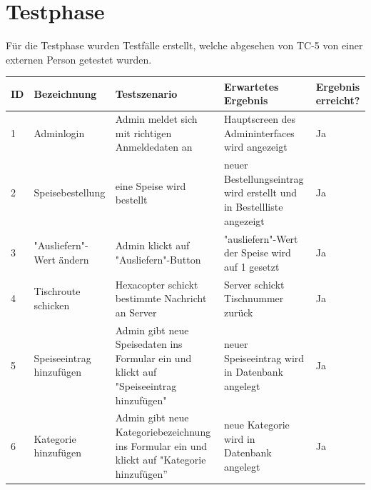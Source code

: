 \section{Testphase}
Für die Testphase wurden Testfälle erstellt, welche abgesehen von TC-5 von einer externen Person getestet wurden.

\begin{table}[H]
\centering
\begin{tabular}{|p{0.5cm}|p{3cm}|p{4.5cm}|p{4cm}|p{2cm}|} 
\hline \textbf{ID} & \textbf{Bezeichnung} & \textbf{Testszenario} & \textbf{Erwartetes Ergebnis} & \textbf{Ergebnis erreicht?} \\\hline
\hline 1 & Adminlogin & Admin meldet sich mit \newline richtigen Anmeldedaten \newline an & Hauptscreen des \newline Admininterfaces wird \newline angezeigt & Ja \\\hline
\hline 2 & Speisebestellung & eine Speise wird bestellt & neuer Bestellungseintrag wird erstellt und in \newline Bestellliste angezeigt & Ja \\\hline
\hline 3 & "Ausliefern"-Wert \newline ändern & Admin klickt auf "Ausliefern"-Button & "ausliefern"-Wert der Speise wird auf 1 gesetzt & Ja \\\hline
\hline 4 & Tischroute \newline schicken & Hexacopter schickt \newline bestimmte Nachricht an Server & Server schickt \newline Tischnummer zurück & Ja \\\hline
\hline 5 & Speiseeintrag \newline hinzufügen & Admin gibt neue \newline Speisedaten ins Formular ein und klickt auf \newline "Speiseeintrag hinzufügen" & neuer Speiseeintrag wird in Datenbank angelegt & Ja \\\hline
\hline 6 & Kategorie \newline hinzufügen & Admin gibt neue \newline Kategoriebezeichnung ins \newline Formular ein und klickt auf \newline "Kategorie hinzufügen” & neue Kategorie wird in Datenbank angelegt & Ja \\\hline

\end{tabular}
\end{table}
